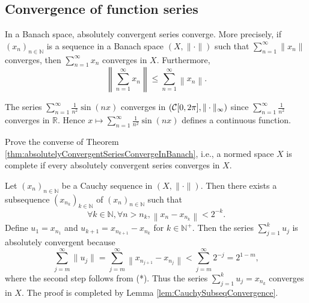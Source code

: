 \subsection{Convergence of function series}

\begin{thm}
  \label{thm:absolutelyConvergentSeriesConvergeInBanach}
  In a Banach space, absolutely convergent series converge.
  More precisely,
  if $(x_n)_{n\in \mathbb{N}}$ is a sequence
  in a Banach space $(X, \|\cdot\|)$
  such that $\sum_{n=1}^{\infty} \|x_n\|$ converges,
  then $\sum_{n=1}^{\infty} x_n$ converges in $X$.
  Furthermore,
  \begin{equation}
    \label{eq:triangleInequalityInfty}
    \left\|\sum_{n=1}^{\infty}x_n\right\|
    \le \sum_{n=1}^{\infty} \left\|x_n\right\|.
  \end{equation}
\end{thm}

\begin{exm}
  The series $\sum_{n=1}^{\infty}\frac{1}{n^2}\sin(nx)$
  converges in $({\cal C}[0,2 \pi], \|\cdot\|_{\infty})$
  since $\sum_{n=1}^{\infty}\frac{1}{n^2}$ converges in $\mathbb{R}$.
  Hence $x\mapsto \sum_{n=1}^{\infty}\frac{1}{n^2}\sin(nx)$
  defines a continuous function. 
\end{exm}

\begin{exc}
  Prove the converse of Theorem
  \ref{thm:absolutelyConvergentSeriesConvergeInBanach},
  i.e., a normed space $X$ is complete
  if every absolutely convergent series converges in $X$.
\end{exc}
\begin{solution}
  Let $(x_n)_{n\in \mathbb{N}}$ be a Cauchy sequence in $(X, \|\cdot\|)$.
  Then there exists a subsequence $\left( x_{n_k} \right)_{k\in \mathbb{N}}$ of
  $(x_n)_{n\in \mathbb{N}}$ such that
  \begin{equation*}
    \tag{*}
    \forall k\in \mathbb{N},
    \forall n > n_k,
    \left\| x_n - x_{n_k} \right\| < 2^{-k}.
  \end{equation*}
  Define $u_1 = x_{n_1}$ and
  $u_{k+1} = x_{n_{k+1}} - x_{n_k}$ for $k \in \mathbb{N}^+$.
  Then the series $\sum_{j=1}^ku_j$ is absolutely convergent because
  \begin{equation*}
    \sum_{j = m}^{\infty}\|u_j\| = \sum_{j=m}^{\infty}\left\| x_{n_{j+1}} - x_{n_j} \right\|
    < \sum_{j=m}^{\infty}2^{-j} = 2^{1-m},
  \end{equation*}
  where the second step follows from (*).
  Thus the series $\sum_{j=1}^ku_j = x_{n_k}$ converges in $X$.
  The proof is completed by Lemma \ref{lem:CauchySubseqConvergence}.
\end{solution}

